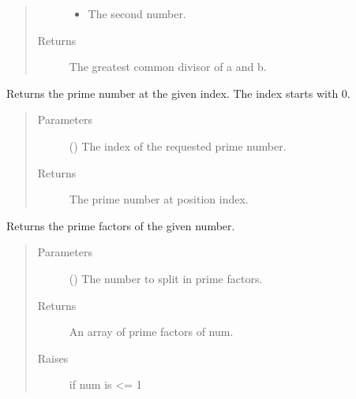 \documentclass[letterpaper,10pt,english]{sphinxmanual}
\begin{document}
\begin{fulllineitems}
\begin{fulllineitems}
\begin{quote}
\begin{description}
\begin{itemize}
\item {} 
 \textendash{} The second number.

\end{itemize}

\item[{Returns}] \leavevmode
The greatest common divisor of a and b.

\end{description}\end{quote}

\end{fulllineitems}


\begin{fulllineitems}
\label{\detokenize{prime:prime.Prime.get_prime}}
Returns the prime number at the given index. The index starts with 0.
\begin{quote}\begin{description}
\item[{Parameters}] \leavevmode
{} () \textendash{} The index of the requested prime number.

\item[{Returns}] \leavevmode
The prime number at position index.

\end{description}\end{quote}

\end{fulllineitems}


\begin{fulllineitems}
\label{\detokenize{prime:prime.Prime.get_prime_factors}}
Returns the prime factors of the given number.
\begin{quote}\begin{description}
\item[{Parameters}] \leavevmode
{} () \textendash{} The number to split in prime factors.

\item[{Returns}] \leavevmode
An array of prime factors of num.

\item[{Raises}] \leavevmode
{} \textendash{} if num is \textless{}= 1

\end{description}\end{quote}

\end{fulllineitems}


\end{fulllineitems}
\end{document}
